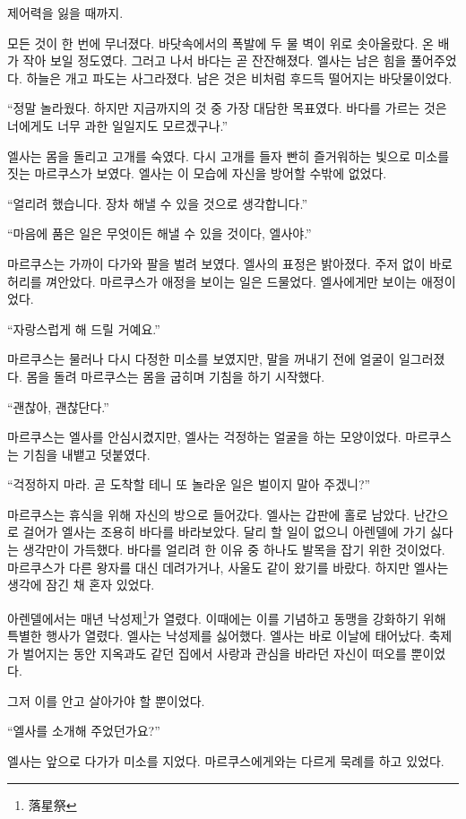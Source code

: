 제어력을 잃을 때까지.

모든 것이 한 번에 무너졌다. 바닷속에서의 폭발에 두 물 벽이 위로 솟아올랐다. 온 배가 작아 보일 정도였다. 그러고 나서 바다는 곧 잔잔해졌다. 엘사는 남은 힘을 풀어주었다. 하늘은 개고 파도는 사그라졌다. 남은 것은 비처럼 후드득 떨어지는 바닷물이었다.

``정말 놀라웠다. 하지만 지금까지의 것 중 가장 대담한 목표였다. 바다를 가르는 것은 너에게도 너무 과한 일일지도 모르겠구나.''

엘사는 몸을 돌리고 고개를 숙였다. 다시 고개를 들자 빤히 즐거워하는 빛으로 미소를 짓는 마르쿠스가 보였다. 엘사는 이 모습에 자신을 방어할 수밖에 없었다.

``얼리려 했습니다. 장차 해낼 수 있을 것으로 생각합니다.''

``마음에 품은 일은 무엇이든 해낼 수 있을 것이다, 엘사야.''

마르쿠스는 가까이 다가와 팔을 벌려 보였다. 엘사의 표정은 밝아졌다. 주저 없이 바로 허리를 껴안았다. 마르쿠스가 애정을 보이는 일은 드물었다. 엘사에게만 보이는 애정이었다.

``자랑스럽게 해 드릴 거예요.''

마르쿠스는 물러나 다시 다정한 미소를 보였지만, 말을 꺼내기 전에 얼굴이 일그러졌다. 몸을 돌려 마르쿠스는 몸을 굽히며 기침을 하기 시작했다.

``괜찮아, 괜찮단다.''

마르쿠스는 엘사를 안심시켰지만, 엘사는 걱정하는 얼굴을 하는 모양이었다. 마르쿠스는 기침을 내뱉고 덧붙였다.

``걱정하지 마라. 곧 도착할 테니 또 놀라운 일은 벌이지 말아 주겠니?''

마르쿠스는 휴식을 위해 자신의 방으로 들어갔다. 엘사는 갑판에 홀로 남았다. 난간으로 걸어가 엘사는 조용히 바다를 바라보았다. 달리 할 일이 없으니 아렌델에 가기 싫다는 생각만이 가득했다. 바다를 얼리려 한 이유 중 하나도 발목을 잡기 위한 것이었다. 마르쿠스가 다른 왕자를 대신 데려가거나, 사울도 같이 왔기를 바랐다. 하지만 엘사는 생각에 잠긴 채 혼자 있었다.

아렌델에서는 매년 낙성제\footnote{落星祭}가 열렸다. 이때에는 이를 기념하고 동맹을 강화하기 위해 특별한 행사가 열렸다. 엘사는 낙성제를 싫어했다. 엘사는 바로 이날에 태어났다. 축제가 벌어지는 동안 지옥과도 같던 집에서 사랑과 관심을 바라던 자신이 떠오를 뿐이었다.

그저 이를 안고 살아가야 할 뿐이었다.

\textbreak

\forceindent``엘사를 소개해 주었던가요?''

엘사는 앞으로 다가가 미소를 지었다. 마르쿠스에게와는 다르게 묵례를 하고 있었다.

